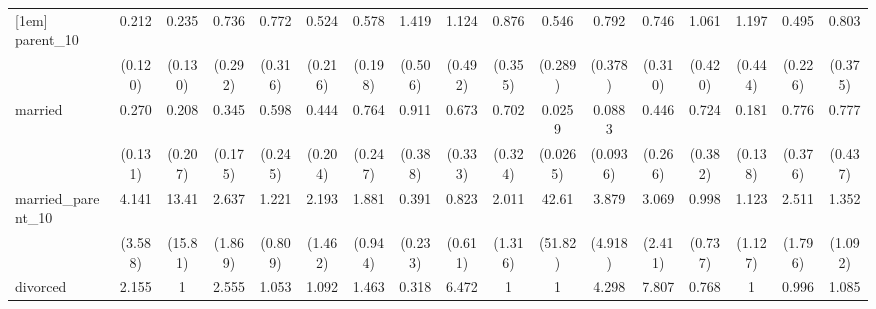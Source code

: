 {\begin{tabular}{l*{16}{c}}
[1em]
parent\_10           &       0.212\sym{**} &       0.235\sym{**} &       0.736         &       0.772         &       0.524         &       0.578         &       1.419         &       1.124         &       0.876         &       0.546         &       0.792         &       0.746         &       1.061         &       1.197         &       0.495         &       0.803         \\
                    &     (0.120)         &     (0.130)         &     (0.292)         &     (0.316)         &     (0.216)         &     (0.198)         &     (0.506)         &     (0.492)         &     (0.355)         &     (0.289)         &     (0.378)         &     (0.310)         &     (0.420)         &     (0.444)         &     (0.226)         &     (0.375)         \\
[1em]
married             &       0.270\sym{**} &       0.208         &       0.345\sym{*}  &       0.598         &       0.444         &       0.764         &       0.911         &       0.673         &       0.702         &      0.0259\sym{***}&      0.0883\sym{*}  &       0.446         &       0.724         &       0.181\sym{*}  &       0.776         &       0.777         \\
                    &     (0.131)         &     (0.207)         &     (0.175)         &     (0.245)         &     (0.204)         &     (0.247)         &     (0.388)         &     (0.333)         &     (0.324)         &    (0.0265)         &    (0.0936)         &     (0.266)         &     (0.382)         &     (0.138)         &     (0.376)         &     (0.437)         \\
[1em]
married\_parent\_10   &       4.141         &       13.41\sym{*}  &       2.637         &       1.221         &       2.193         &       1.881         &       0.391         &       0.823         &       2.011         &       42.61\sym{**} &       3.879         &       3.069         &       0.998         &       1.123         &       2.511         &       1.352         \\
                    &     (3.588)         &     (15.81)         &     (1.869)         &     (0.809)         &     (1.462)         &     (0.944)         &     (0.233)         &     (0.611)         &     (1.316)         &     (51.82)         &     (4.918)         &     (2.411)         &     (0.737)         &     (1.127)         &     (1.796)         &     (1.092)         \\
[1em]
divorced            &       2.155         &           1         &       2.555         &       1.053         &       1.092         &       1.463         &       0.318         &       6.472\sym{***}&           1         &           1         &       4.298\sym{*}  &       7.807\sym{**} &       0.768         &           1         &       0.996         &       1.085         \\

\end{tabular}}
